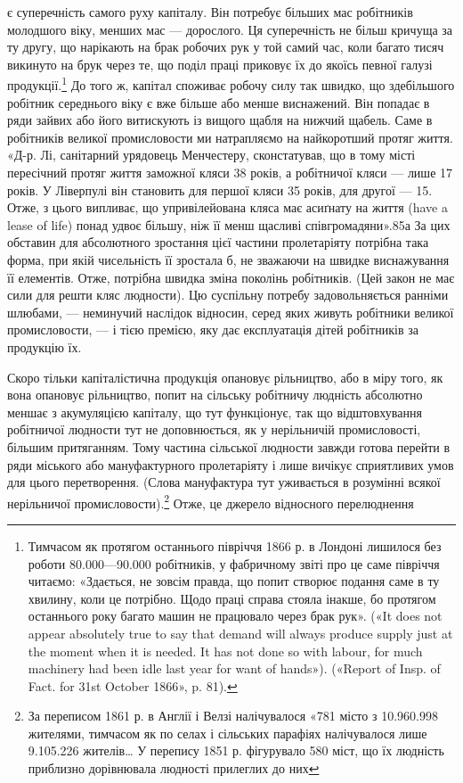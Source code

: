 \parcont{}  %
є суперечність самого руху капіталу. Він потребує більших мас робітників молодшого віку, менших мас
— дорослого. Ця суперечність не більш кричуща за ту другу, що нарікають на брак робочих рук у той
самий час, коли багато тисяч викинуто на
брук через те, що поділ праці приковує їх до якоїсь певної галузі продукції.\footnote{
Тимчасом як протягом останнього півріччя 1866 р. в Лондоні лишилося без роботи 80.000—90.000
робітників, у фабричному звіті про це саме півріччя читаємо: «Здається, не зовсім правда, що попит
створює подання саме в ту хвилину, коли це потрібно. Щодо праці справа стояла інакше, бо протягом
останнього року багато машин не працювало через брак рук». («It does not appear absolutely true to
say that demand
will always produce supply just at the moment when it is needed. It has not done so with labour, for
much machinery had been idle last year for want of hands»). («Report of Insp. of Fact. for 31st
October 1866», p. 81).
} До того ж, капітал
споживає робочу силу так швидко, що здебільшого робітник середнього віку є вже більше або менше
виснажений. Він попадає в ряди зайвих або його витискують
із вищого щабля на нижчий щабель. Саме в робітників великої промисловости ми натрапляємо на
найкоротший протяг життя. «Д-р. Лі, санітарний урядовець Менчестеру, сконстатував, що в тому місті
пересічний протяг життя заможної кляси
38 років, а робітничої кляси — лише 17 років. У Ліверпулі він становить для першої кляси 35 років,
для другої — 15. Отже, з цього випливає, що упривілейована кляса має асиґнату на життя (have a lease
of life) понад удвоє більшу, ніж її менш щасливі співгромадяни».85а За цих обставин для абсолютного
зростання цієї частини пролетаріяту потрібна така форма, при якій чисельність її зростала б, не
зважаючи на швидке виснажування її елементів. Отже, потрібна швидка зміна поколінь робітників.
(Цей закон не має сили для решти кляс людности).
Цю суспільну потребу задовольняється ранніми шлюбами, — неминучий наслідок відносин, серед яких
живуть робітники великої промисловости, — і тією премією, яку дає експлуатація дітей робітників за
продукцію їх.

Скоро тільки капіталістична продукція опановує рільництво, або в міру того, як вона опановує
рільництво, попит на сільську робітничу людність абсолютно меншає з акумуляцією капіталу, що тут
функціонує, так що відштовхування робітничої людности
тут не доповнюється, як у нерільничій промисловості, більшим притяганням. Тому частина сільської
людности завжди готова перейти в ряди міського або мануфактурного пролетаріяту і лише вичікує
сприятливих умов для цього перетворення. (Слова мануфактура тут уживається в розумінні всякої
нерільничої
промисловости).\footnote{
За переписом 1861 р. в Англії і Велзі налічувалося «781 місто з 10.960.998 жителями, тимчасом як
по селах і сільських парафіях налічувалося лише 9.105.226 жителів\dots{} У перепису 1851 р. фігурувало
580 міст, що їх людність приблизно дорівнювала людності прилеглих до них
} Отже, це джерело відносного перелюднення

